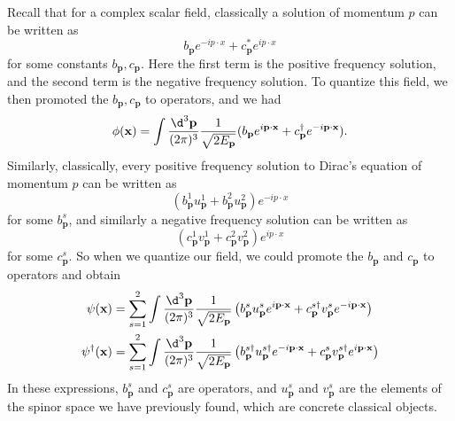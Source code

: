 \documentclass[a4paper]{article}
\begin{document}
Recall that for a complex scalar field, classically a solution of momentum $p$ can be written as
\[
  b_\mathbf{p} e^{-ip\cdot x} + c_\mathbf{p}^* e^{ip\cdot x}
\]
for some constants $b_\mathbf{p}, c_\mathbf{p}$. Here the first term is the positive frequency solution, and the second term is the negative frequency solution. To quantize this field, we then promoted the $b_\mathbf{p}, c_\mathbf{p}$ to operators, and we had
\[
  \phi(\mathbf{x}) = \int \frac{\d^3 \mathbf{p}}{(2\pi)^3} \frac{1}{\sqrt{2E_\mathbf{p}}} (b_\mathbf{p} e^{i\mathbf{p}\cdot \mathbf{x}} + c_\mathbf{p}^\dagger e^{-i\mathbf{p}\cdot \mathbf{x}}).
\]
Similarly, classically, every positive frequency solution to Dirac's equation of momentum $p$ can be written as
\[
  (b_\mathbf{p}^1 u_\mathbf{p}^1 + b_\mathbf{p}^2 u_\mathbf{p}^2)e^{-ip\cdot x}
\]
for some $b_\mathbf{p}^s$, and similarly a negative frequency solution can be written as
\[
  (c_\mathbf{p}^1 v_\mathbf{p}^1 + c_\mathbf{p}^2 v_\mathbf{p}^2) e^{ip\cdot x}
\]
for some $c_\mathbf{p}^s$. So when we quantize our field, we could promote the $b_\mathbf{p}$ and $c_\mathbf{p}$ to operators and obtain
\begin{align*}
  \psi(\mathbf{x}) &= \sum_{s = 1}^2 \int \frac{\d^3 \mathbf{p}}{(2\pi)^3} \frac{1}{\sqrt{2 E_\mathbf{p}}} \left(b_\mathbf{p}^s u_\mathbf{p}^s e^{i\mathbf{p}\cdot \mathbf{x}} + c_\mathbf{p}^{s\dagger}v_\mathbf{p}^s e^{-i\mathbf{p}\cdot \mathbf{x}}\right)\\
  \psi^\dagger (\mathbf{x}) &= \sum_{s = 1}^2 \int \frac{\d^3 \mathbf{p}}{(2\pi)^3} \frac{1}{\sqrt{2 E_\mathbf{p}}} \left(b_\mathbf{p}^{s\dagger} u_\mathbf{p}^{s\dagger} e^{-i\mathbf{p}\cdot \mathbf{x}} + c_\mathbf{p}^{s}v_\mathbf{p}^{s\dagger} e^{i\mathbf{p}\cdot \mathbf{x}}\right)
\end{align*}
In these expressions, $b_\mathbf{p}^s$ and $c_\mathbf{p}^s$ are operators, and $u_\mathbf{p}^s$ and $v_\mathbf{p}^s$ are the elements of the spinor space we have previously found, which are concrete classical objects.
\end{document}
